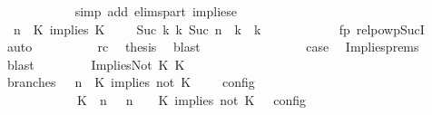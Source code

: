 \begin{isabellebody}
\ \ \ \ \ \ \ \ \ \ \isamarkupfalse%
\ {\isacharparenleft}simp\ add{\isacharcolon}\ elims{\isacharunderscore}part\ implies{\isacharunderscore}e{}{\isacharparenright}\isanewline
\ \ \ \ \ \ \ \ \isamarkupfalse%
\ {\isacartoucheopen}{\isacharparenleft}{\isasymGamma}{\isacharcomma}\ n\ {\isasymturnstile}\ {\isacharparenleft}{\isacharparenleft}K\ implies\ K\ {\isacharhash}\ {\isasymPsi}{\isacharparenright}\ {\isasymtriangleright}\ {\isasymPhi}{\isacharparenright}\ {\isasymhookrightarrow}\isactrlbsup Suc\ k\isactrlesup \ {\isacharparenleft}{\isasymGamma}\isactrlsub k{\isacharcomma}\ Suc\ n\ {\isasymturnstile}\ {\isasymPsi}\isactrlsub k\ {\isasymtriangleright}\ {\isasymPhi}\isactrlsub k{\isacharparenright}{\isacartoucheclose}\isanewline
\ \ \ \ \ \ \ \ \ \ \isamarkupfalse%
\ fp\ relpowp{\isacharunderscore}Suc{\isacharunderscore}I{}\ \isamarkupfalse%
\ auto\isanewline
\ \ \ \ \ \ \ \ \isamarkupfalse%
\ rc\ \isamarkupfalse%
\ {\isacharquery}thesis\ \isamarkupfalse%
\ blast\isanewline
\ \ \ \ \ \ \isamarkupfalse%
\isanewline
\ \ \ \ \ \ \isamarkupfalse%
\ \isamarkupfalse%
\ {\isacharquery}case\ \isamarkupfalse%
\ Implies{\isachardot}prems{\isacharparenleft}{}{\isacharparenright}\ \isamarkupfalse%
\ blast\isanewline
\ \ \isamarkupfalse%
\isanewline
\ \ \ \ \isamarkupfalse%
\ {\isacharparenleft}ImpliesNot\ K\ K\isanewline
\ \ \ \ \ \ \isamarkupfalse%
\ branches{\isacharcolon}\ {\isacartoucheopen}{\isasymlbrakk}\ {\isasymGamma}{\isacharcomma}\ n\ {\isasymturnstile}\ {\isacharparenleft}{\isacharparenleft}K\ implies\ not\ K\ {\isacharhash}\ {\isasymPsi}{\isacharparenright}\ {\isasymtriangleright}\ {\isasymPhi}\ {\isasymrbrakk}\isactrlsub c\isactrlsub o\isactrlsub n\isactrlsub f\isactrlsub i\isactrlsub g\isanewline
\ \ \ \ \ \ \ \ \ \ {\isacharequal}\ {\isasymlbrakk}\ {\isacharparenleft}{\isacharparenleft}K\ {\isasymnot}{\isasymUp}\ n{\isacharparenright}\ {\isacharhash}\ {\isasymGamma}{\isacharparenright}{\isacharcomma}\ n\ {\isasymturnstile}\ {\isasymPsi}\ {\isasymtriangleright}\ {\isacharparenleft}{\isacharparenleft}K\ implies\ not\ K\ {\isacharhash}\ {\isasymPhi}{\isacharparenright}\ {\isasymrbrakk}\isactrlsub c\isactrlsub o\isactrlsub n\isactrlsub f\isactrlsub i\isactrlsub g\isanewline

\end{isabellebody}
